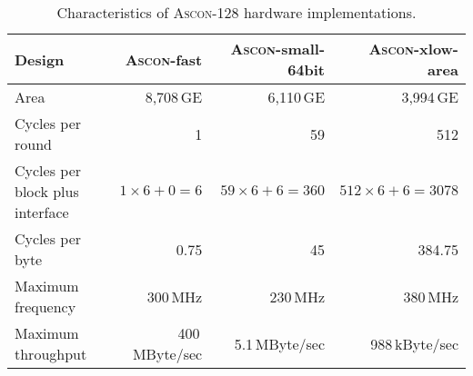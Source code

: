 \documentclass[runningheads]{llncs}
\begin{document}
\begin{table}[htb]
  \caption{Characteristics of \textsc{Ascon}-128 hardware implementations.}
\label{tbl:hw-char}
\centering
\begin{tabular}{l@{\hskip 12pt}r@{\hskip 12pt}r@{\hskip 12pt}r} \toprule
  Design & \textsc{Ascon}-fast & \textsc{Ascon}-small-64bit & \textsc{Ascon}-xlow-area \\
  \midrule
  Area                             & 8,708\,GE            & 6,110\,GE               & 3,994\,GE                 \\
  Cycles per round                 & 1                    & 59                      & 512                       \\
  Cycles per block plus interface  & $1 \times 6 + 0 = 6$ & $59 \times 6 + 6 = 360$ & $512 \times 6 + 6 = 3078$ \\
  Cycles per byte                  & 0.75                 & 45                      & 384.75                    \\
  Maximum frequency                & 300\,MHz             & 230\,MHz                & 380\,MHz                  \\
  Maximum throughput               & 400\,MByte/sec       & 5.1\,MByte/sec          & 988\,kByte/sec            \\
  \bottomrule %
\end{tabular}
\end{table}%



\vspace*{-.5cm} %


 

\appendix
\end{document}
